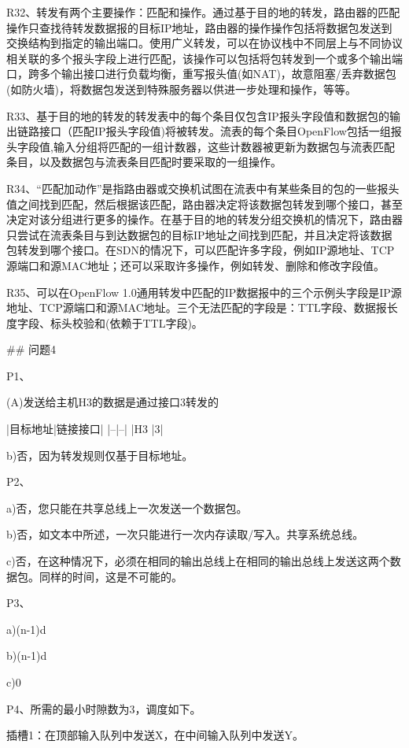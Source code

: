 \documentclass[11pt,UTF8,twoside]{article}
\begin{document}
	R32、转发有两个主要操作：匹配和操作。通过基于目的地的转发，路由器的匹配操作只查找待转发数据报的目标IP地址，路由器的操作操作包括将数据包发送到交换结构到指定的输出端口。使用广义转发，可以在协议栈中不同层上与不同协议相关联的多个报头字段上进行匹配，该操作可以包括将包转发到一个或多个输出端口，跨多个输出接口进行负载均衡，重写报头值(如NAT)，故意阻塞/丢弃数据包(如防火墙)，将数据包发送到特殊服务器以供进一步处理和操作，等等。
	
	R33、基于目的地的转发的转发表中的每个条目仅包含IP报头字段值和数据包的输出链路接口（匹配IP报头字段值)将被转发。流表的每个条目OpenFlow包括一组报头字段值,输入分组将匹配的一组计数器，这些计数器被更新为数据包与流表匹配条目，以及数据包与流表条目匹配时要采取的一组操作。
	
	R34、“匹配加动作”是指路由器或交换机试图在流表中有某些条目的包的一些报头值之间找到匹配，然后根据该匹配，路由器决定将该数据包转发到哪个接口，甚至决定对该分组进行更多的操作。在基于目的地的转发分组交换机的情况下，路由器只尝试在流表条目与到达数据包的目标IP地址之间找到匹配，并且决定将该数据包转发到哪个接口。在SDN的情况下，可以匹配许多字段，例如IP源地址、TCP源端口和源MAC地址；还可以采取许多操作，例如转发、删除和修改字段值。
	
	R35、可以在OpenFlow 1.0通用转发中匹配的IP数据报中的三个示例头字段是IP源地址、TCP源端口和源MAC地址。三个无法匹配的字段是：TTL字段、数据报长度字段、标头校验和(依赖于TTL字段)。
	
	\newpage
\pagestyle{fancy}
\fancyhf{}  %
\pagestyle{fancy}
	## 问题4 
	
	P1、
	
	(A)发送给主机H3的数据是通过接口3转发的
	
	|目标地址|链接接口|
	|--|--|
	|H3 |3|
	
	b)否，因为转发规则仅基于目标地址。
	
	P2、
	
	a)否，您只能在共享总线上一次发送一个数据包。
	
	b)否，如文本中所述，一次只能进行一次内存读取/写入。共享系统总线。
	
	c)否，在这种情况下，必须在相同的输出总线上在相同的输出总线上发送这两个数据包。同样的时间，这是不可能的。
	
	P3、
	
	a)(n-1)d
	
	b)(n-1)d
	
	c)0
	
	P4、所需的最小时隙数为3，调度如下。
	
	插槽1：在顶部输入队列中发送X，在中间输入队列中发送Y。
	
\end{document}
